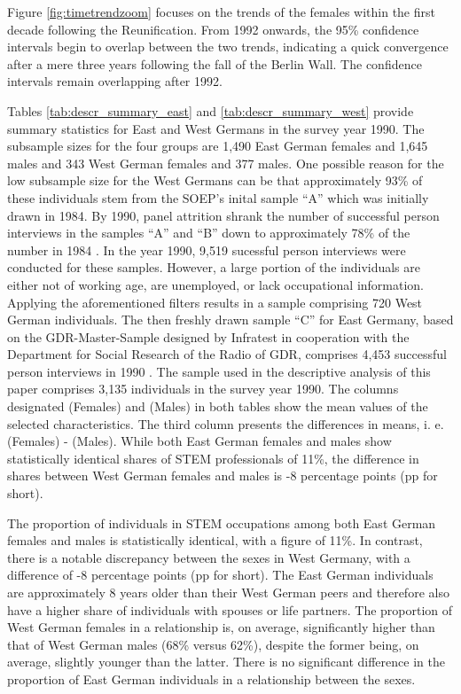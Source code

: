 \documentclass[a4paper, oneside, hyperfootnotes = false]{article}
\begin{document}
{Figure \ref{fig:timetrendzoom} focuses on the trends of the females within the first decade following the Reunification.
From 1992 onwards, the 95\% confidence intervals begin to overlap between the two trends, indicating a quick convergence after a mere three years following the fall of the Berlin Wall.
The confidence intervals remain overlapping after 1992.

Tables \ref{tab:descr_summary_east} and \ref{tab:descr_summary_west} provide summary statistics for East and West Germans in the survey year 1990.
The subsample sizes for the four groups are 1,490 East German females and 1,645 males and 343 West German females and 377 males.
One possible reason for the low subsample size for the West Germans can be that approximately 93\% of these individuals stem from the SOEP's inital sample ``A'' which was initially drawn in 1984.
By 1990, panel attrition shrank the number of successful person interviews in the samples ``A'' and ``B'' down to approximately 78\% of the number in 1984 \citep{Siegers2022}.
In the year 1990, 9,519 sucessful person interviews were conducted for these samples.
However, a large portion of the individuals are either not of working age, are unemployed, or lack occupational information.
Applying the aforementioned filters results in a sample comprising 720 West German individuals.
The then freshly drawn sample ``C'' for East Germany, based on the GDR-Master-Sample designed by Infratest in cooperation with the Department for Social Research of the Radio of GDR, comprises 4,453 successful person interviews in 1990 \citep{Infratest2011, Siegers2022}.
The sample used in the descriptive analysis of this paper comprises 3,135 individuals in the survey year 1990.
The columns designated (Females) and (Males) in both tables show the mean values of the selected characteristics.
The third column presents the differences in means, i. e. (Females) - (Males).
While both East German females and males show statistically identical shares of STEM professionals of 11\%, the difference in shares between West German females and males is -8 percentage points (pp for short).

The proportion of individuals in STEM occupations among both East German females and males is statistically identical, with a figure of 11\%.
In contrast, there is a notable discrepancy between the sexes in West Germany, with a difference of -8 percentage points (pp for short).
The East German individuals are approximately 8 years older than their West German peers and therefore also have a higher share of individuals with spouses or life partners.
The proportion of West German females in a relationship is, on average, significantly higher than that of West German males (68\% versus 62\%), despite the former being, on average, slightly younger than the latter.
There is no significant difference in the proportion of East German individuals in a relationship between the sexes.

}
\end{document}
